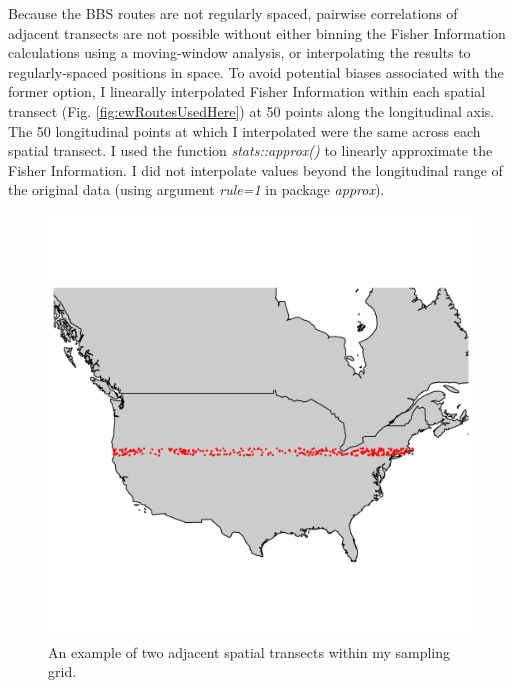 \documentclass[12pt,twoside,openany]{reedthesis}
\begin{document}
Because the BBS routes are not regularly spaced, pairwise correlations of adjacent transects are not possible without either binning the Fisher Information calculations using a moving-window analysis, or interpolating the results to regularly-spaced positions in space. To avoid potential biases associated with the former option, I linearally interpolated Fisher Information within each spatial transect (Fig. \ref{fig:ewRoutesUsedHere}) at 50 points along the longitudinal axis. The 50 longitudinal points at which I interpolated were the same across each spatial transect. I used the function \emph{stats::approx()} to linearly approximate the Fisher Information. I did not interpolate values beyond the longitudinal range of the original data (using argument \emph{rule=1} in package \emph{approx}).
\begin{figure}
\includegraphics[width=0.85\linewidth]{./chapterFiles/fisherSpatial/figures/figsCalledInDiss/transectSamplingEx_1row} \caption{An example of two adjacent spatial transects within my sampling grid.}\label{fig:oneTsectEx}
\end{figure}
\end{document}
